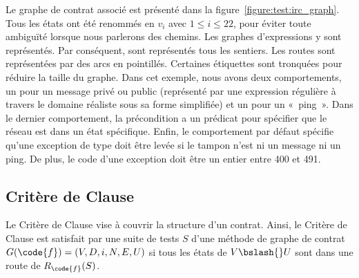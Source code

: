 %
Le graphe de contrat associé est présenté dans la
figure~\ref{figure:test:irc_graph}. Tous les états ont été renommés en $v_i$
avec $1 \leq i \leq 22$, pour éviter toute ambiguïté lorsque nous parlerons des
chemins. Les graphes d'expressions y sont représentés. Par conséquent, sont
représentés tous les sentiers. Les routes sont représentées par des arcs en
pointillés. Certaines étiquettes sont tronquées pour réduire la taille du
graphe. Dans cet exemple, nous avons deux comportements, un pour un message
privé ou public (représenté par une expression régulière à travers le domaine
réaliste  sous sa forme simplifiée) et un pour un «~ping~». Dans le
dernier comportement, la précondition a un prédicat pour spécifier que le réseau
est dans un état spécifique. Enfin, le comportement par défaut spécifie qu'une
exception de type 
doit être levée si le tampon n'est ni un message ni un ping. De plus, le code
d'une exception doit être un entier entre 400 et 491.

\subsection{Critère de Clause}

Le Critère de Clause vise à couvrir la structure d'un contrat. Ainsi, le Critère
de Clause est satisfait par une suite de tests $S$ d'une méthode  de
graphe de contrat $G(\code{f}) = (V, D, i, N, E, U)$ si tous les états de $V
\bslash{}U$ sont dans une route de $R_\code{f}(S)$.

